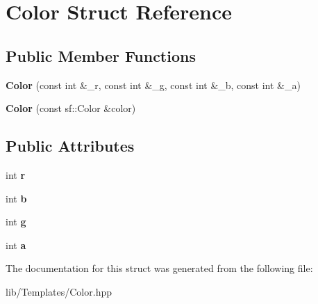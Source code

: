 \hypertarget{struct_color}{}\section{Color Struct Reference}
\label{struct_color}
\subsection*{Public Member Functions}
\begin{DoxyCompactItemize}
\item 
\mbox{\label{struct_color_a72044de8fa4875bd7539515bdaa7eb9c}} 
{\bfseries Color} (const int \&\+\_\+r, const int \&\+\_\+g, const int \&\+\_\+b, const int \&\+\_\+a)
\item 
\mbox{\label{struct_color_a54f0af3c549ccb609e1f217b9e192622}} 
{\bfseries Color} (const sf\+::\+Color \&color)
\end{DoxyCompactItemize}
\subsection*{Public Attributes}
\begin{DoxyCompactItemize}
\item 
\mbox{\label{struct_color_a4954bdc9772da2a610401b8a438125cb}} 
int {\bfseries r}
\item 
\mbox{\label{struct_color_ae11f00d34bf3ecd8c8278f68876b82bf}} 
int {\bfseries b}
\item 
\mbox{\label{struct_color_ab5656e995bddd43d286c7ff5629a31dd}} 
int {\bfseries g}
\item 
\mbox{\label{struct_color_aa85f0a7c4980f26d7799dbbc8c1f7aa2}} 
int {\bfseries a}
\end{DoxyCompactItemize}


The documentation for this struct was generated from the following file\+:\begin{DoxyCompactItemize}
\item 
lib/\+Templates/Color.\+hpp\end{DoxyCompactItemize}
